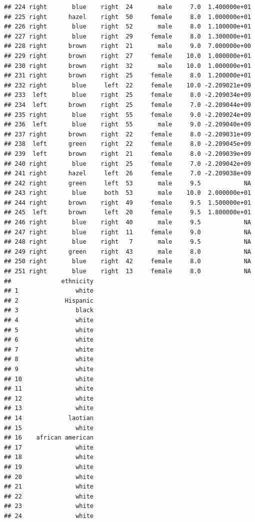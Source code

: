 \documentclass[]{article}
\begin{document}
\begin{verbatim}
## 224 right       blue    right  24       male     7.0  1.400000e+01
## 225 right      hazel    right  50     female     8.0  1.000000e+01
## 226 right       blue    right  52       male     8.0  1.100000e+01
## 227 right       blue    right  29     female     8.0  1.300000e+01
## 228 right      brown    right  21       male     9.0  7.000000e+00
## 229 right      brown    right  27     female    10.0  1.000000e+01
## 230 right      brown    right  32       male    10.0  1.000000e+01
## 231 right      brown    right  25     female     8.0  1.200000e+01
## 232 right       blue     left  22     female    10.0 -2.209021e+09
## 233  left       blue    right  25     female     8.0 -2.209034e+09
## 234  left      brown    right  25     female     7.0 -2.209044e+09
## 235 right       blue    right  55     female     9.0 -2.209024e+09
## 236  left       blue    right  55       male     9.0 -2.209040e+09
## 237 right      brown    right  22     female     8.0 -2.209031e+09
## 238  left      green    right  22     female     8.0 -2.209045e+09
## 239  left      brown    right  21     female     8.0 -2.209039e+09
## 240 right       blue    right  25     female     7.0 -2.209042e+09
## 241 right      hazel     left  26     female     7.0 -2.209038e+09
## 242 right      green     left  53       male     9.5            NA
## 243 right       blue     both  53       male    10.0  2.000000e+01
## 244 right      brown    right  49     female     9.5  1.500000e+01
## 245  left      brown     left  20     female     9.5  1.800000e+01
## 246 right       blue    right  40       male     9.5            NA
## 247 right       blue    right  11     female     9.0            NA
## 248 right       blue    right   7       male     9.5            NA
## 249 right      green    right  43       male     8.0            NA
## 250 right       blue    right  42     female     8.0            NA
## 251 right       blue    right  13     female     8.0            NA
##              ethnicity
## 1                white
## 2             Hispanic
## 3                black
## 4                white
## 5                white
## 6                white
## 7                white
## 8                white
## 9                white
## 10               white
## 11               white
## 12               white
## 13               white
## 14             laotian
## 15               white
## 16    african american
## 17               white
## 18               white
## 19               white
## 20               white
## 21               white
## 22               white
## 23               white
## 24               white

\end{verbatim}
\end{document}
